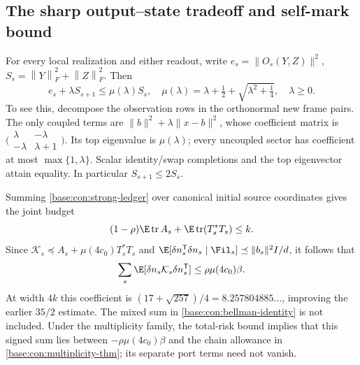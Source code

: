 \documentclass[11pt,oneside,openany,a4paper]{book}
\numberwithin{equation}{chapter}
\theoremstyle{definition}
\theoremstyle{remark}
\newcommand{\T}{\mathsf T}\newcommand{\Id}{I}
\newcommand{\F}[1]{\left\lVert#1\right\rVert_F}
\DeclareMathOperator{\tr}{tr}\DeclareMathOperator{\rank}{rank}
\begin{document}
\subsection{The sharp output--state tradeoff and self-mark bound}
For every local realization and either readout, write $e_s=\|O_s(Y,Z)\|^2$, $S_s=\F Y^2+\F Z^2$. Then
\begin{equation}\label{base:con:sharp-local}
 e_s+\lambda S_{s+1}\le\mu(\lambda)S_s,
 \quad\mu(\lambda)=\lambda+\tfrac12+\sqrt{\lambda^2+\tfrac14},\quad\lambda\ge0.
\end{equation}
To see this, decompose the observation rows in the orthonormal new frame pairs. The only coupled terms are $\|b\|^2+\lambda\|x-b\|^2$, whose coefficient matrix is
$\bigl(\begin{smallmatrix}\lambda&-\lambda\\-\lambda&\lambda+1\end{smallmatrix}\bigr)$.
Its top eigenvalue is $\mu(\lambda)$; every uncoupled sector has coefficient at most $\max\{1,\lambda\}$. Scalar identity/swap completions and the top eigenvector attain equality. In particular $S_{s+1}\le2S_s$.

Summing \eqref{base:con:strong-ledger} over canonical initial source coordinates gives the joint budget
\[
 (1-\rho)\E\tr A_s+\E\tr(T_s^*T_s)\le k.
\]
Since $\mathcal K_s\preceq A_s+\mu(4c_0)T_s^*T_s$ and
$\E[\delta n_s^\T\delta n_s\mid\Fil_s]\preceq\|b_s\|^2I/d$, it follows that
\begin{equation}\label{base:con:selfmark}
 \sum_s\E[\delta n_s\mathcal K_s\delta n_s^\T]
 \le\rho\mu(4c_0)\beta.
\end{equation}
At width $4k$ this coefficient is $(17+\sqrt{257})/4=8.257804885\ldots$, improving the earlier $35/2$ estimate. The mixed sum in \eqref{base:con:bellman-identity} is not included. Under the multiplicity family, the total-risk bound implies that this signed sum lies between $-\rho\mu(4c_0)\beta$ and the chain allowance in \eqref{base:con:multiplicity-thm}; its separate port terms need not vanish.
\end{document}
